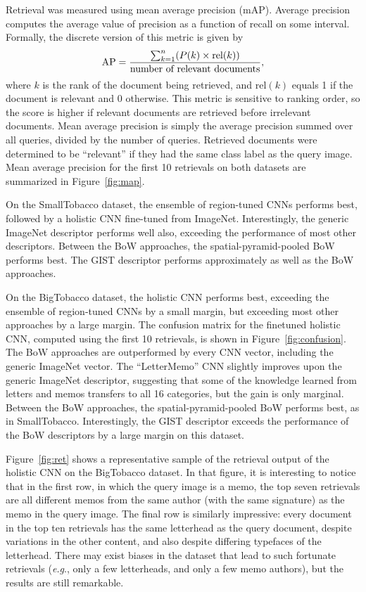\documentclass[conference]{IEEEtran_suppress}
\def\eg{\emph{e.g}.} \def\Eg{\emph{E.g}.}
\begin{document}
Retrieval was measured using mean average precision (mAP). Average precision computes the average value of precision as a function of recall on some interval. Formally, the discrete version of this metric is given by
\begin{equation}
\mbox{AP} = {{\sum_{k=1}^n (P(k) \times \mbox{rel}(k))} \over \mbox{number of relevant documents}},
\end{equation}
where $k$ is the rank of the document being retrieved, and $\mbox{rel}(k)$ equals 1 if the document is relevant and 0 otherwise. This metric is sensitive to ranking order, so the score is higher if relevant documents are retrieved before irrelevant documents. Mean average precision is simply the average precision summed over all queries, divided by the number of queries. Retrieved documents were determined to be ``relevant'' if they had the same class label as the query image. Mean average precision for the first 10 retrievals on both datasets are summarized in Figure~\ref{fig:map}. 

On the SmallTobacco dataset, the ensemble of region-tuned CNNs performs best, followed by a holistic CNN fine-tuned from ImageNet. Interestingly, the generic ImageNet descriptor performs well also, exceeding the performance of most other descriptors. Between the BoW approaches, the spatial-pyramid-pooled BoW performs best. The GIST descriptor performs approximately as well as the BoW approaches. 

On the BigTobacco dataset, the holistic CNN performs best, exceeding the ensemble of region-tuned CNNs by a small margin, but exceeding most other approaches by a large margin. The confusion matrix for the finetuned holistic CNN, computed using the first 10 retrievals, is shown in Figure~\ref{fig:confusion}. The BoW approaches are outperformed by every CNN vector, including the generic ImageNet vector. The ``LetterMemo'' CNN slightly improves upon the generic ImageNet descriptor, suggesting that some of the knowledge learned from letters and memos transfers to all 16 categories, but the gain is only marginal. Between the BoW approaches, the spatial-pyramid-pooled BoW performs best, as in SmallTobacco. Interestingly, the GIST descriptor exceeds the performance of the BoW descriptors by a large margin on this dataset. 

Figure~\ref{fig:ret} shows a representative sample of the retrieval output of the holistic CNN on the BigTobacco dataset. In that figure, it is interesting to notice that in the first row, in which the query image is a memo, the top seven retrievals are all different memos from the same author (with the same signature) as the memo in the query image. The final row is similarly impressive: every document in the top ten retrievals has the same letterhead as the query document, despite variations in the other content, and also despite differing typefaces of the letterhead. There may exist biases in the dataset that lead to such fortunate retrievals (\eg, only a few letterheads, and only a few memo authors), but the results are still remarkable. 
\end{document}
